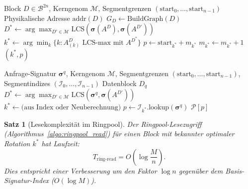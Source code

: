 ﻿\documentclass[a4paper,12pt]{article}
\theoremstyle{definition}
\theoremstyle{plain}
\newtheorem{satz}{Satz}[section]
\begin{document}
\begin{algorithm}[H]
\caption{Ringpool-Indexierung (Schreiben)}
\label{algo:ringpool_write}
\begin{algorithmic}[1]
\Require Block $D \in \mathcal{B}^{2n}$, Kerngenom $\mathcal{M}$,
         Segmentgrenzen $(\mathrm{start}_0, \ldots, \mathrm{start}_{n-1})$
\Ensure Physikalische Adresse $\mathrm{addr}(D)$
\State $G_D \gets \mathrm{BuildGraph}(D)$
\State $D^* \gets \arg\max_{D' \in \mathcal{M}}
  \mathrm{LCS}(\boldsymbol{\sigma}(A^D), \boldsymbol{\sigma}(A^{D'}))$
\State $k^* \gets \arg\min_k \{k : A^D_{(k)} \text{ LCS-max mit } A^{D^*}\}$
\State $p \gets \mathrm{start}_{k^*} + m_{k^*}$
\State $m_{k^*} \gets m_{k^*} + 1$
\State \Return $(k^*, p)$
\end{algorithmic}
\end{algorithm}

\begin{algorithm}[H]
\caption{Ringpool-Lesezugriff (Lesen)}
\label{algo:ringpool_read}
\begin{algorithmic}[1]
\Require Anfrage-Signatur $\boldsymbol{\sigma}^q$, Kerngenom $\mathcal{M}$,
         Segmentgrenzen $(\mathrm{start}_0, \ldots, \mathrm{start}_{n-1})$,
         Segmentindizes $(\mathcal{I}_0, \ldots, \mathcal{I}_{n-1})$
\Ensure Datenblock $D_q$
\State $D^* \gets \arg\max_{D' \in \mathcal{M}}
  \mathrm{LCS}(\boldsymbol{\sigma}^q, \boldsymbol{\sigma}(A^{D'}))$
\State $k^* \gets \text{(aus Index oder Neuberechnung)}$
\State $p \gets \mathcal{I}_{k^*}.\mathrm{lookup}(\boldsymbol{\sigma}^q)$
\State \Return $\mathcal{P}[p]$
\end{algorithmic}
\end{algorithm}

\begin{satz}[Lesekomplexität im Ringpool]
\label{satz:ringpool_lesen}
  Der Ringpool-Lesezugriff (Algorithmus~\ref{algo:ringpool_read}) für
  einen Block mit bekannter optimaler Rotation $k^*$ hat Laufzeit:
  \[
    T_{\mathrm{ring\text{-}read}} = O\!\left(\log\frac{M}{n}\right).
  \]
  Dies entspricht einer Verbesserung um den Faktor $\log n$ gegenüber
  dem Basis-Signatur-Index ($O(\log M)$).
\end{satz}
\end{document}
